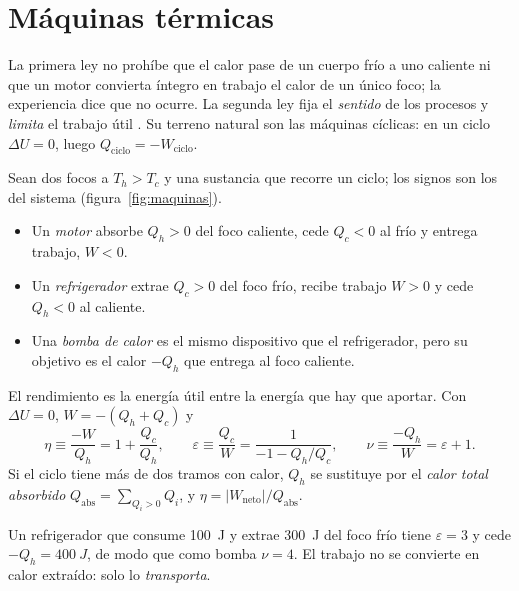 \section{Máquinas térmicas}
La primera ley no prohíbe que el calor pase de un cuerpo frío a uno caliente ni que un motor convierta
íntegro en trabajo el calor de un único foco; la experiencia dice que no ocurre. La segunda ley fija el
\emph{sentido} de los procesos y \emph{limita} el trabajo útil \cite{gonzalez1,gonzalez2}. Su terreno natural
son las máquinas cíclicas: en un ciclo $\Delta U=0$, luego $Q_{\mathrm{ciclo}}=-W_{\mathrm{ciclo}}$.

\begin{definicion}
Sean dos focos a $T_h>T_c$ y una sustancia que recorre un ciclo; los signos son los del sistema
(figura~\ref{fig:maquinas}).
\begin{itemize}[leftmargin=1.4em]
\item Un \emph{motor} absorbe $Q_h>0$ del foco caliente, cede $Q_c<0$ al frío y entrega trabajo, $W<0$.
\item Un \emph{refrigerador} extrae $Q_c>0$ del foco frío, recibe trabajo $W>0$ y cede $Q_h<0$ al caliente.
\item Una \emph{bomba de calor} es el mismo dispositivo que el refrigerador, pero su objetivo es el calor
  $-Q_h$ que entrega al foco caliente.
\end{itemize}
\end{definicion}

\begin{definicion}
El rendimiento es la energía útil entre la energía que hay que aportar. Con $\Delta U=0$, $W=-(Q_h+Q_c)$ y
\begin{equation}\label{eq:rendimientos}
  \eta\equiv\frac{-W}{Q_h}=1+\frac{Q_c}{Q_h},\qquad
  \varepsilon\equiv\frac{Q_c}{W}=\frac{1}{-1-Q_h/Q_c},\qquad
  \nu\equiv\frac{-Q_h}{W}=\varepsilon+1 .
\end{equation}
Si el ciclo tiene más de dos tramos con calor, $Q_h$ se sustituye por el \emph{calor total absorbido}
$Q_{\mathrm{abs}}=\sum_{Q_i>0}Q_i$, y $\eta=|W_{\mathrm{neto}}|/Q_{\mathrm{abs}}$.
\end{definicion}



\begin{observacion}
Un refrigerador que consume \SI{100}{J} y extrae \SI{300}{J} del foco frío tiene $\varepsilon=3$ y cede
$-Q_h=\SI{400}{J}$, de modo que como bomba $\nu=4$. El trabajo no se convierte en calor extraído: solo lo
\emph{transporta}.
\end{observacion}

